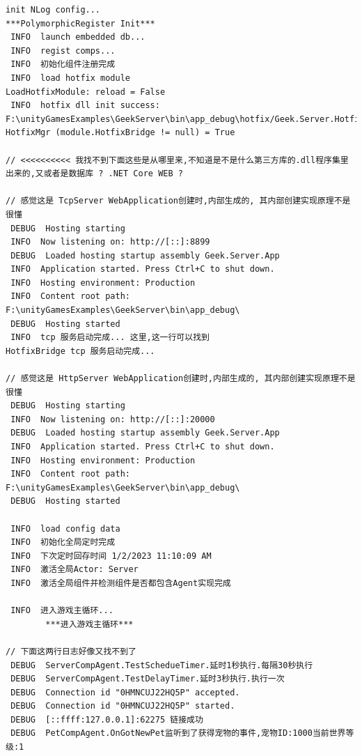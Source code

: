 \documentclass[9pt, b5paper]{article}
\begin{document}
\begin{verbatim}
init NLog config...
***PolymorphicRegister Init***
 INFO  launch embedded db...
 INFO  regist comps...
 INFO  初始化组件注册完成
 INFO  load hotfix module
LoadHotfixModule: reload = False
 INFO  hotfix dll init success: F:\unityGamesExamples\GeekServer\bin\app_debug\hotfix/Geek.Server.Hotfix.dll
HotfixMgr (module.HotfixBridge != null) = True

// <<<<<<<<<< 我找不到下面这些是从哪里来,不知道是不是什么第三方库的.dll程序集里出来的,又或者是数据库 ? .NET Core WEB ?

// 感觉这是 TcpServer WebApplication创建时,内部生成的, 其内部创建实现原理不是很懂
 DEBUG  Hosting starting
 INFO  Now listening on: http://[::]:8899
 DEBUG  Loaded hosting startup assembly Geek.Server.App
 INFO  Application started. Press Ctrl+C to shut down.
 INFO  Hosting environment: Production
 INFO  Content root path: F:\unityGamesExamples\GeekServer\bin\app_debug\
 DEBUG  Hosting started
 INFO  tcp 服务启动完成... 这里,这一行可以找到
HotfixBridge tcp 服务启动完成...

// 感觉这是 HttpServer WebApplication创建时,内部生成的, 其内部创建实现原理不是很懂
 DEBUG  Hosting starting
 INFO  Now listening on: http://[::]:20000
 DEBUG  Loaded hosting startup assembly Geek.Server.App
 INFO  Application started. Press Ctrl+C to shut down.
 INFO  Hosting environment: Production
 INFO  Content root path: F:\unityGamesExamples\GeekServer\bin\app_debug\
 DEBUG  Hosting started

 INFO  load config data
 INFO  初始化全局定时完成
 INFO  下次定时回存时间 1/2/2023 11:10:09 AM
 INFO  激活全局Actor: Server
 INFO  激活全局组件并检测组件是否都包含Agent实现完成

 INFO  进入游戏主循环...
        ***进入游戏主循环***

// 下面这两行日志好像又找不到了
 DEBUG  ServerCompAgent.TestSchedueTimer.延时1秒执行.每隔30秒执行
 DEBUG  ServerCompAgent.TestDelayTimer.延时3秒执行.执行一次
 DEBUG  Connection id "0HMNCUJ22HQ5P" accepted.
 DEBUG  Connection id "0HMNCUJ22HQ5P" started.
 DEBUG  [::ffff:127.0.0.1]:62275 链接成功
 DEBUG  PetCompAgent.OnGotNewPet监听到了获得宠物的事件,宠物ID:1000当前世界等级:1


\end{verbatim}
\end{document}
